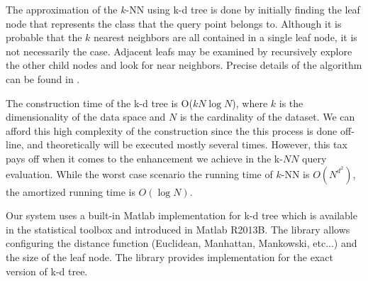 \iftoggle{edit-mode}{\hspace{0pt}\marginpar{How the NN are found?}}{}
The approximation of the $k$-NN using k-d tree is done by initially finding the leaf node that represents the class that the query point belongs to. Although it is probable that the $k$ nearest neighbors are all contained in a single leaf node, it is not necessarily the case. Adjacent leafs may be examined by recursively explore the other child nodes and look for near neighbors. Precise details of the algorithm can be found in \cite{bentley1975multidimensional}.
 
\iftoggle{edit-mode}{\hspace{0pt}\marginpar{Expected time complexity}}{}
The construction time of the k-d tree is O($k N \log N$), where $k$ is the dimensionality of the data space and $N$ is the cardinality of the dataset. We can afford this high complexity of the construction since the this process is done off-line, and theoretically will be executed mostly several times. However, this tax pays off when it comes to the enhancement we achieve in the k-$NN$ query evaluation. While the worst case scenario the running time of $k$-NN is $O(N^{d^2})$, the amortized running time is $O(\log N)$.

\iftoggle{edit-mode}{\hspace{0pt}\marginpar{The Matlab library}}{} 
Our system uses a built-in Matlab implementation for k-d tree which is available in the statistical toolbox and introduced in Matlab R2013B. The library allows configuring the distance function (Euclidean, Manhattan, Mankowski, etc...) and the size of the leaf node. The library provides implementation for the exact version of k-d tree.

\newpage{}

